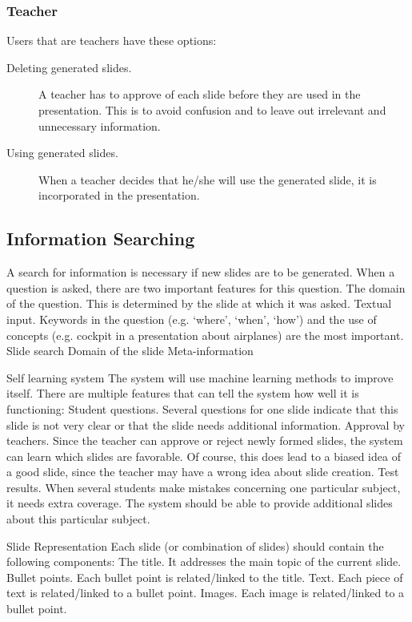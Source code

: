 \documentclass[11pt]{article}
\begin{document}
\subsubsection{Teacher}
Users that are teachers have these options: 
\begin{description}
\item[Deleting generated slides.] A teacher has to approve of each slide before they are used in the presentation. This is to avoid confusion and to leave out irrelevant and unnecessary information.
\item[Using generated slides.] When a teacher decides that he/she will use the generated slide, it is incorporated in the presentation. 
\end{description}

\subsection{Information Searching}
A search for information is necessary if new slides are to be generated. When a question is asked, there are two important features for this question.
The domain of the question. This is determined by the slide at which it was asked. 
Textual input. Keywords in the question (e.g. `where’, `when’, `how’) and the use of concepts (e.g. cockpit in a presentation about airplanes) are the most important.
Slide search
Domain of the slide
Meta-information



Self learning system
The system will use machine learning methods to improve itself. There are multiple features that can tell the system how well it is functioning:
Student questions. Several questions for one slide indicate that this slide is not very clear or that the slide needs additional information. 
Approval by teachers. Since the teacher can approve or reject newly formed slides, the system can learn which slides are favorable. Of course, this does lead to a biased idea of a good slide, since the teacher may have a wrong idea about slide creation. 
Test results. When several students make mistakes concerning one particular subject, it needs extra coverage. The system should be able to provide additional slides about this particular subject.


Slide Representation
Each slide (or combination of slides) should contain the following components:
The title. It addresses the main topic of the current slide.
Bullet points. Each bullet point is related/linked to the title. 
Text. Each piece of text is related/linked to a bullet point.
Images. Each image is related/linked to a bullet point.
\end{document}
